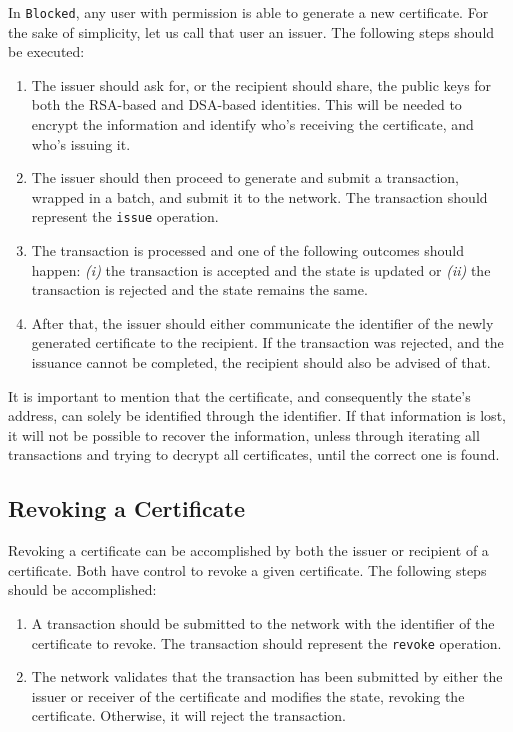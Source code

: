 In \texttt{Blocked}, any user with permission is able to generate a new certificate. For the sake of simplicity, let us call that user an issuer. The following steps should be executed:

\begin{enumerate}
	\item The issuer should ask for, or the recipient should share, the public keys for both the RSA-based and DSA-based identities. This will be needed to encrypt the information and identify who's receiving the certificate, and who's issuing it.
	\item The issuer should then proceed to generate and submit a transaction, wrapped in a batch, and submit it to the network. The transaction should represent the \texttt{issue} operation.
	\item The transaction is processed and one of the following outcomes should happen: \emph{(i)} the transaction is accepted and the state is updated or \emph{(ii)} the transaction is rejected and the state remains the same.
	\item After that, the issuer should either communicate the identifier of the newly generated certificate to the recipient. If the transaction was rejected, and the issuance cannot be completed, the recipient should also be advised of that.
\end{enumerate}

It is important to mention that the certificate, and consequently the state's address, can solely be identified through the identifier. If that information is lost, it will not be possible to recover the information, unless through iterating all transactions and trying to decrypt all certificates, until the correct one is found.

\subsection{Revoking a Certificate}

Revoking a certificate can be accomplished by both the issuer or recipient of a certificate. Both have control to revoke a given certificate. The following steps should be accomplished:

\begin{enumerate}
	\item A transaction should be submitted to the network with the identifier of the certificate to revoke. The transaction should represent the \texttt{revoke} operation.
	\item The network validates that the transaction has been submitted by either the issuer or receiver of the certificate and modifies the state, revoking the certificate. Otherwise, it will reject the transaction.
\end{enumerate}

